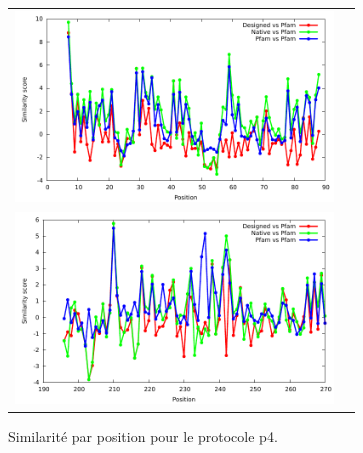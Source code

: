 \documentclass[a4paper,12pt]{article}
\begin{document}
\begin{figure}[t]
\begin{tabular}{cc}
       \includegraphics[width=8.45cm]{images/1O4C_p4_similarity_bypos.pdf} \\
       \includegraphics[width=8.45cm]{images/1R6J_p4_similarity_bypos.pdf} \\
     \end{tabular}
     
     \caption{Similarité par position pour le protocole p4.}
     \label{Sim_pos_byp4}
   \end{figure}
\end{document}
